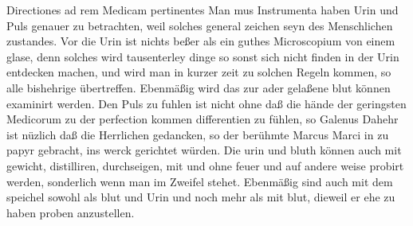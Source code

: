 \normalsize%
\centering%
Directiones ad rem Medicam pertinentes
\pend%
\vspace{0.7em}%
\pstart%
\noindent%
Man mus Instrumenta haben Urin\protect{} und Puls\protect{} genauer zu betrachten, weil solches general zeichen seyn des Menschlichen zustandes.
\pend%
\count{}
\count{}
\count{}
\pstart%
Vor die Urin\protect{} ist nichts be{\ss}er als ein guthes Microscopium\protect{} von einem glase, denn solches wird tausenterley dinge so sonst sich nicht finden in der Urin\protect{} entdecken machen, und wird man in kurzer zeit zu solchen Regeln kommen, so alle bishehrige \"{u}bertreffen. 
\pend%
\pstart%
Ebenm\"{a}{\ss}ig wird das zur ader gela{\ss}ene blut\protect{} k\"{o}nnen examinirt werden. Den Puls\protect{} zu fuhlen ist nicht ohne da{\ss} die h\"{a}nde der geringsten Medicorum\protect{} zu der perfection kommen
differentien zu f\"{u}hlen, so Galenus\protect{}
%
Dahehr ist n\"{u}zlich da{\ss} die Herrlichen gedancken, so der ber\"{u}hmte Marcus Marci\protect{} in 
zu papyr gebracht, ins werck gerichtet w\"{u}rden.
\pend%
\pstart%
Die urin\protect{} und bluth\protect{} k\"{o}nnen auch mit gewicht, distilliren\protect{}, durchseigen, mit und ohne feuer und auf andere weise probirt werden, sonderlich wenn man im Zweifel stehet.
\pend%
\newpage
\pstart%
Ebenm\"{a}{\ss}ig sind auch mit dem speichel\protect{} sowohl als blut\protect{} und Urin\protect{} und noch mehr als mit blut\protect{}, dieweil er ehe zu haben proben anzustellen.
\pend
\pstart%
